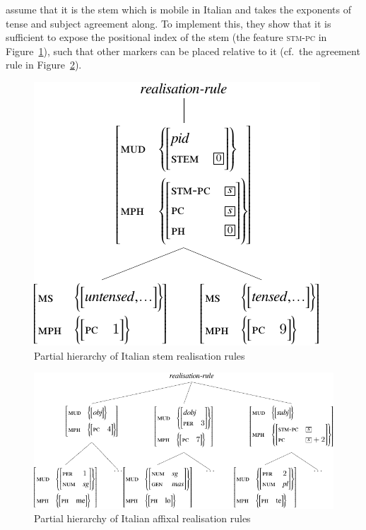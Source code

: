 \documentclass[output=paper
                ,modfonts
                ,nonflat
	        ,collection
	        ,collectionchapter
	        ,collectiontoclongg
 	        ,biblatex
                ,babelshorthands
                ,newtxmath
                ,draftmode
                ,colorlinks, citecolor=brown
]{./langsci/langscibook}
\begin{document}
{\citet{Crysmann:Bonami:2016} assume that it is the stem which is
mobile in Italian and takes the exponents of tense and subject
agreement along. To implement this, they show that it is sufficient to
expose the positional index of the stem (the feature \textsc{stm-pc}
in Figure~\ref{fig:ItalianStem}), such that other markers can
be placed relative to it (cf.~the agreement rule in Figure~\ref{fig:ItalianAff}).  

\begin{figure}[htb]\centering
  
  \includegraphics[scale=.9]{figures/italian-stem-crop}
  
  \caption{Partial hierarchy of Italian stem realisation rules}
  \label{fig:ItalianStem}
\end{figure}

\begin{figure}[htb]
  \centering
  \includegraphics[scale=.84]{figures/italian-affix-crop}
  
  \caption{Partial hierarchy of Italian affixal realisation rules}
  \label{fig:ItalianAff}
\end{figure}



}
\end{document}
